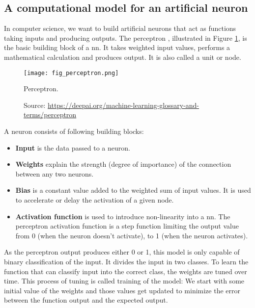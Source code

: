 \subsection{A computational model for an artificial neuron}
In computer science, we want to build artificial neurons that act as functions taking inputs and producing outputs. The perceptron \cite{rosenblatt1958perceptron, minsky2017perceptrons}, illustrated in Figure \ref{fig:perceptron}, is the basic building block of a \acrfull{nn}. It takes weighted input values, performs a mathematical calculation and produces output. It is also called a unit or node.
\begin{figure}[ht]
    \begin{center}
    \texttt{[image: fig\_perceptron.png]}
    \caption[Perceptron]{Perceptron.}
    \caption*{Source: \href{https://deepai.org/machine-learning-glossary-and-terms/perceptron}{https://deepai.org/machine-learning-glossary-and-terms/perceptron}}
    \label{fig:perceptron}
    \end{center}
\end{figure}
A neuron consists of following building blocks:
\begin{itemize}
    \item \textbf{Input} is the data passed to a neuron.
    \item \textbf{Weights} explain the strength (degree of importance) of the connection between any two neurons.
    \item \textbf{Bias} is a constant value added to the weighted sum of input values. It is used to accelerate or delay the activation of a given node.
    \item \textbf{Activation function} is used to introduce non-linearity into a \acrshort{nn}. The perceptron activation function is a step function limiting the output value from 0 (when the neuron doesn't activate), to 1 (when the neuron activates).
\end{itemize}
As the perceptron output produces either 0 or 1, this model is only capable of binary classification of the input. It divides the input in two classes. To learn the function that can classify input into the correct class, the weights are tuned over time. This process of tuning is called training of the model: We start with some initial value of the weights and those values get updated to minimize the error between the function output and the expected output.

